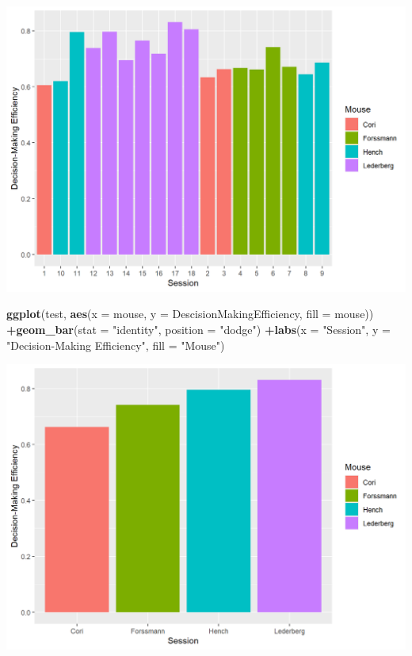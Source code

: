 \documentclass[
]{article}
\newenvironment{Shaded}{\begin{snugshade}}{\end{snugshade}}
\newcommand{\AttributeTok}[1]{\textcolor[rgb]{0.13,0.29,0.53}{#1}}
\newcommand{\FunctionTok}[1]{\textcolor[rgb]{0.13,0.29,0.53}{\textbf{#1}}}
\newcommand{\NormalTok}[1]{#1}
\newcommand{\SpecialCharTok}[1]{\textcolor[rgb]{0.81,0.36,0.00}{\textbf{#1}}}
\newcommand{\StringTok}[1]{\textcolor[rgb]{0.31,0.60,0.02}{#1}}
\begin{document}
\includegraphics{images/unnamed-chunk-11-1.png}

\begin{Shaded}
\begin{Highlighting}[]
\FunctionTok{ggplot}\NormalTok{(test, }\FunctionTok{aes}\NormalTok{(}\AttributeTok{x =}\NormalTok{ mouse, }\AttributeTok{y =}\NormalTok{ DescisionMakingEfficiency, }\AttributeTok{fill =}\NormalTok{ mouse)) }\SpecialCharTok{+}\FunctionTok{geom\_bar}\NormalTok{(}\AttributeTok{stat =} \StringTok{"identity"}\NormalTok{, }\AttributeTok{position =} \StringTok{"dodge"}\NormalTok{) }\SpecialCharTok{+}\FunctionTok{labs}\NormalTok{(}\AttributeTok{x =} \StringTok{"Session"}\NormalTok{, }\AttributeTok{y =} \StringTok{"Decision{-}Making Efficiency"}\NormalTok{, }\AttributeTok{fill =} \StringTok{"Mouse"}\NormalTok{)}
\end{Highlighting}
\end{Shaded}

\includegraphics{images/unnamed-chunk-11-2.png}
\end{document}
